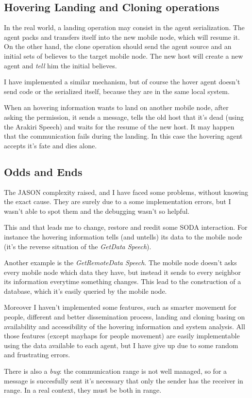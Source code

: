 \subsection{Hovering Landing and Cloning operations}

In the real world, a landing operation may consist in the agent serialization.
The agent packs and transfers itself into the new mobile node, which will resume
it. On the other hand, the clone operation should send the agent source and an
initial sets of believes to the target mobile node. The new host will create a
new agent and \emph{tell} him the initial believes.

I have implemented a similar mechanism, but of course the hover agent doesn't
send code or the serialized itself, because they are in the same local system.

When an hovering information wants to land on another mobile node, after asking
the permission, it sends a message, tells the old host that it's dead (using
the Arakiri Speech) and waits for the resume of the new host. It may happen
that the communication fails during the landing. In this case the hovering
agent accepts it's fate and dies alone.

\subsection{Odds and Ends}

The JASON complexity raised, and I have faced some problems, without knowing
the exact cause. They are surely due to a some implementation errors, but I
wasn't able to spot them and the debugging wasn't so helpful. 

This and that leads me to change, restore and reedit some SODA interaction. For
instance the hovering information tells (and untells) its data to the mobile
node (it's the reverse situation of the \emph{GetData Speech}).

Another example is the \emph{GetRemoteData Speech}. The mobile node doesn't
asks every mobile node which data they have, but instead it sends to every
neighbor its information everytime something changes. This lead to the
construction of a database, which it's easily queried by the mobile node.

Moreover I haven't implemented some features, such as smarter movement for
people, different and better dissemination process, landing and cloning basing
on availability and accessibility of the hovering information and system
analysis. All those features (except mayhaps for people movement) are easily
implementable using the data available to each agent, but I have give up due to
some random and frustrating errors.

There is also a \emph{bug}: the communication range is not well managed, so for
a message is succesfully sent it's necessary that only the sender has the
receiver in range. In a real context, they must be both in range.
